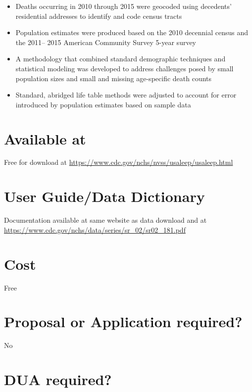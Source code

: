 \documentclass[
]{book}
\providecommand{\tightlist}{%
  \setlength{\itemsep}{0pt}\setlength{\parskip}{0pt}}
\begin{document}
\begin{itemize}
\tightlist
\item
  Deaths occurring in 2010 through 2015 were geocoded using decedents' residential addresses to identify and code census tracts
\item
  Population estimates were produced based on the 2010 decennial census and the 2011-- 2015 American Community Survey 5-year survey
\item
  A methodology that combined standard demographic techniques and statistical modeling was developed to address challenges posed by small population sizes and small and missing age-specific death counts
\item
  Standard, abridged life table methods were adjusted to account for error introduced by population estimates based on sample data
\end{itemize}

\hypertarget{available-at-95}{%
\section{Available at}\label{available-at-95}}

Free for download at \url{https://www.cdc.gov/nchs/nvss/usaleep/usaleep.html}

\hypertarget{user-guidedata-dictionary-95}{%
\section{User Guide/Data Dictionary}\label{user-guidedata-dictionary-95}}

Documentation available at same website as data download and at \url{https://www.cdc.gov/nchs/data/series/sr_02/sr02_181.pdf}

\hypertarget{cost-95}{%
\section{Cost}\label{cost-95}}

Free

\hypertarget{proposal-or-application-required-95}{%
\section{Proposal or Application required?}\label{proposal-or-application-required-95}}

No

\hypertarget{dua-required-95}{%
\section{DUA required?}\label{dua-required-95}}
\end{document}
